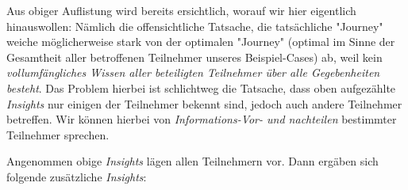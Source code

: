 \begin{Example}
\vspace{0.3cm}

Aus obiger Auflistung wird bereits ersichtlich, worauf wir hier eigentlich hinauswollen: Nämlich die offensichtliche Tatsache, die tatsächliche "Journey" weiche möglicherweise stark von der optimalen "Journey" (optimal im Sinne der Gesamtheit aller betroffenen Teilnehmer unseres Beispiel-Cases) ab, weil kein \textit{vollumfängliches Wissen aller beteiligten Teilnehmer über alle Gegebenheiten besteht}. Das Problem hierbei ist schlichtweg die Tatsache, dass oben aufgezählte \textit{Insights} nur einigen der Teilnehmer bekennt sind, jedoch auch andere Teilnehmer betreffen. Wir können hierbei von \textit{Informations-Vor- und nachteilen} bestimmter Teilnehmer sprechen.

\vspace{0.2cm}

Angenommen obige \textit{Insights} lägen allen Teilnehmern vor. Dann ergäben sich folgende zusätzliche \textit{Insights}:

\vspace{0.2cm}

\vspace{0.2cm}

\vspace{0.2cm}

\vspace{0.2cm}

\vspace{0.2cm}

\end{Example}

\vspace{0.3cm}


\vspace{0.3cm}

